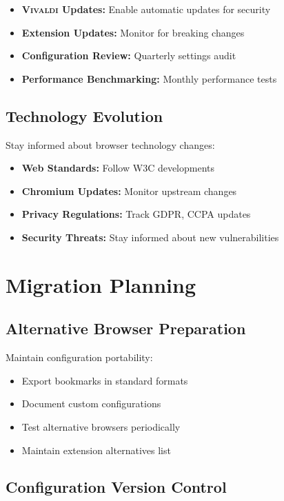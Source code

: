 \documentclass[11pt,a4paper,oneside]{book}
\newcommand{\vivaldi}{\textsc{Vivaldi}}
\begin{document}
\begin{itemize}
    \item \textbf{\vivaldi{} Updates:} Enable automatic updates for security
    \item \textbf{Extension Updates:} Monitor for breaking changes
    \item \textbf{Configuration Review:} Quarterly settings audit
    \item \textbf{Performance Benchmarking:} Monthly performance tests
\end{itemize}

\subsection{Technology Evolution}

Stay informed about browser technology changes:

\begin{itemize}
    \item \textbf{Web Standards:} Follow W3C developments
    \item \textbf{Chromium Updates:} Monitor upstream changes
    \item \textbf{Privacy Regulations:} Track GDPR, CCPA updates
    \item \textbf{Security Threats:} Stay informed about new vulnerabilities
\end{itemize}

\section{Migration Planning}

\subsection{Alternative Browser Preparation}

Maintain configuration portability:

\begin{itemize}
    \item Export bookmarks in standard formats
    \item Document custom configurations
    \item Test alternative browsers periodically
    \item Maintain extension alternatives list
\end{itemize}

\subsection{Configuration Version Control}
\end{document}
